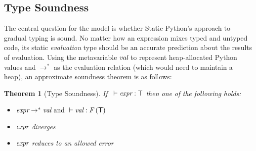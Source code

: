 \documentclass[english,cleveref,submission]{programming}
\newcommand{\SP}{Static Python}
\newcommand{\code}[1]{\texttt{#1}}
\newcommand{\spapp}[2]{#1\,(#2)}
\newcommand{\spann}[2]{#1\!:\!#2}
\newcommand{\typefont}[1]{\mathsf{#1}}
\newcommand{\codefont}[1]{\emph{#1}}
\newcommand{\sptype}{\typefont{T}}
\newcommand{\spteval}{\typefont{S}}
\newcommand{\sptenv}{\typefont{Env}}
\newcommand{\sptvardef}[2]{\spann{#1}{#2}}
\newcommand{\sptfundef}[3]{\spapp{#1}{#2}\code{ -> }#3}
\newcommand{\sptclassdef}[4]{\mathrm{class}~\spapp{#1}{#2}:~#3;~#4}
\newcommand{\spx}{\code{x}}
\newcommand{\spf}{\code{f}}
\newcommand{\spc}{\code{c}}
\newcommand{\spexpr}{\codefont{expr}}
\newcommand{\spvalue}{\codefont{val}}
\newcommand{\vdashsub}[1]{\vdash_{#1}}
\newcommand{\wtprog}{\vdashsub{\mathbf{P}}}
\newcommand{\wtexpr}{\vdashsub{\mathbf{E}}}
\newcommand{\spsubteq}{\mathrel{\leq:}}
\newcommand{\spvardef}[3]{\sptvardef{#1}{#2} = #3}
\newcommand{\spfundef}[4]{\mathrm{def}~\spapp{#1}{#2}\code{ -> }#3: #4}
\newcommand{\spclassdef}[4]{\mathrm{class}~\spapp{#1}{#2}:~#3;~#4}
\newcommand{\spself}{\code{self}}
\newcommand{\spenvapp}[2]{\spapp{#1}{#2}}
\newcommand{\sprred}{\rightarrow^*}
\newcommand{\mfapply}[2]{#1\,(#2)}
\newcommand{\mffont}[1]{\mathit{#1}}
\newcommand{\mftypeF}[1]{\mfapply{\mffont{F}}{#1}}
\newtheorem{theorem}{Theorem}
\begin{document}
%
%


\subsection{Type Soundness}

The central question for the model is whether \SP{}'s approach to gradual typing
is sound.
No matter how an expression mixes typed and untyped code, its static
\emph{evaluation} type should be an accurate prediction about the results
of evaluation.
Using the metavariable $\spvalue$ to represent heap-allocated Python values
and $\sprred$ as the evaluation relation (which would need to maintain a heap),
an approximate soundness theorem is as follows:

\begin{theorem}[Type Soundness]
  If\ \(~\vdash \spexpr : \sptype\)
  then one of the following holds:
  \begin{itemize}
    \item
      \(\spexpr \sprred \spvalue
        \mbox{ and }
        \vdash \spvalue : \mftypeF{\sptype}
      \)
    \item
      \(\spexpr\) diverges
    \item
      \(\spexpr\) reduces to an allowed error
  \end{itemize}
\end{theorem}
\end{document}
